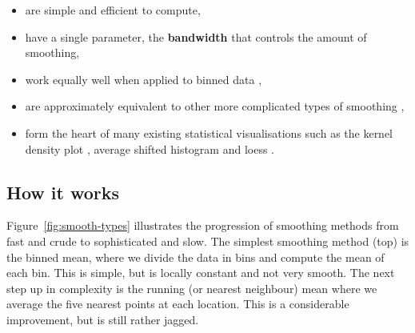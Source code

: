 \documentclass[journal]{vgtc}                %
\begin{document}
\begin{itemize}
  \item are simple and efficient to compute,
  
  \item have a single parameter, the {\bf bandwidth} that controls the amount of smoothing,

  \item work equally well when applied to binned data \cite{wand:1994},
  
  \item are approximately equivalent to other more complicated types of smoothing \citep{silverman:1984}, 
  
  \item form the heart of many existing statistical visualisations such as the kernel density plot \citep{scott:1992}, average shifted histogram \citep{scott:1985} and loess \citep{cleveland:1979}.

\end{itemize}

\subsection{How it works}

Figure~\ref{fig:smooth-types} illustrates the progression of smoothing methods from fast and crude to sophisticated and slow. The simplest smoothing method (top) is the binned mean, where we divide the data in bins and compute the mean of each bin. This is simple, but is locally constant and not very smooth. The next step up in complexity is the running (or nearest neighbour) mean where we average the five nearest points at each location. This is a considerable improvement, but is still rather jagged.
\end{document}
